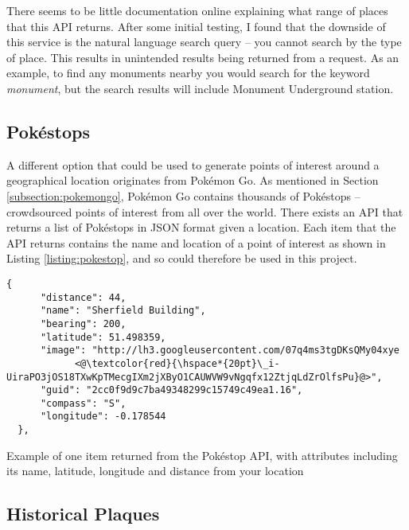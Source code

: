 There seems to be little documentation online explaining what range of places that this API returns. After some initial testing, I found that the downside of this service is the natural language search query -- you cannot search by the type of place. This results in unintended results being returned from a request. As an example, to find any monuments nearby you would search for the keyword \textit{monument}, but the search results will include Monument Underground station.


\subsection{Pok\'{e}stops}

A different option that could be used to generate points of interest around a geographical location originates from Pok\'{e}mon Go. As mentioned in Section \ref{subsection:pokemongo}, Pok\'{e}mon Go contains thousands of Pok\'{e}stops -- crowdsourced points of interest from all over the world. There exists an API \cite{Selwyn} that returns a list of Pok\'{e}stops in JSON format given a location. Each item that the API returns contains the name and location of a point of interest as shown in Listing \ref{listing:pokestop}, and so could therefore be used in this project.

\medskip

\begin{listing}
  \centering
  \begin{lstlisting}[style=json]
  {
      "distance": 44, 
      "name": "Sherfield Building", 
      "bearing": 200, 
      "latitude": 51.498359, 
      "image": "http://lh3.googleusercontent.com/07q4ms3tgDKsQMy04xye
            <@\textcolor{red}{\hspace*{20pt}\_i-UiraPO3jOS18TXwKpTMecgIXm2jXByO1CAUWVW9vNgqfx12ZtjqLdZrOlfsPu}@>", 
      "guid": "2cc0f9d9c7ba49348299c15749c49ea1.16", 
      "compass": "S", 
      "longitude": -0.178544
  }, 
  \end{lstlisting}
  \caption{Example of one item returned from the Pok\'{e}stop API, with attributes including its name, latitude, longitude and distance from your location}
  \label{listing:pokestop}
\end{listing}

\subsection{Historical Plaques}

